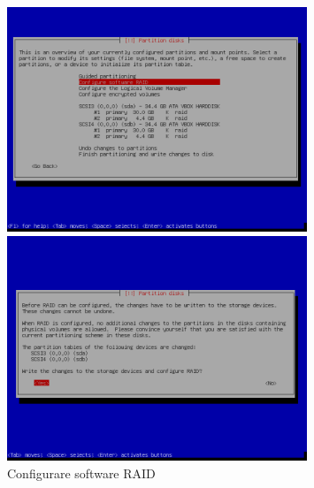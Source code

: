 \documentclass[11pt]{article}
\begin{document}
\begin{figure}[H]
    \includegraphics[width=0.8\textwidth, keepaspectratio]{../img/raid install/raid9.png}
    \centering
    \caption{Configurare software RAID}

    \includegraphics[width=0.8\textwidth, keepaspectratio]{../img/raid install/raid10.png}
    \centering
\end{figure}
\end{document}
